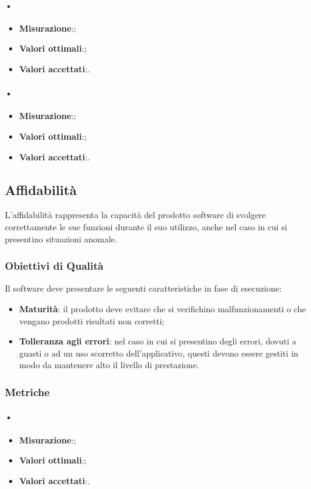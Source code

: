 \paragraph{•}
\begin{itemize}
\item \textbf{Misurazione}:;
\item \textbf{Valori ottimali}:;
\item \textbf{Valori accettati}:.
\end{itemize}

\paragraph{•}
\begin{itemize}
\item \textbf{Misurazione}:;
\item \textbf{Valori ottimali}:;
\item \textbf{Valori accettati}:.
\end{itemize}

\subsection{Affidabilità}
L’affidabilità rappresenta la capacità del prodotto software di svolgere correttamente le sue funzioni durante il suo utilizzo, anche nel caso in cui si presentino situazioni anomale.

\subsubsection{Obiettivi di Qualità}
Il software deve presentare le seguenti caratteristiche in fase di esecuzione:	
\begin{itemize}
\item \textbf{Maturità}: il prodotto deve evitare che si verifichino malfunzionamenti o che vengano prodotti risultati non corretti;
\item \textbf{Tolleranza agli errori}: nel caso in cui si presentino degli errori, dovuti a guasti o ad un uso scorretto dell'applicativo, questi devono essere gestiti in modo da mantenere alto il livello di prestazione.
\end{itemize}

\subsubsection{Metriche}

\paragraph{•}
\begin{itemize}
\item \textbf{Misurazione}:;
\item \textbf{Valori ottimali}:;
\item \textbf{Valori accettati}:.
\end{itemize}

